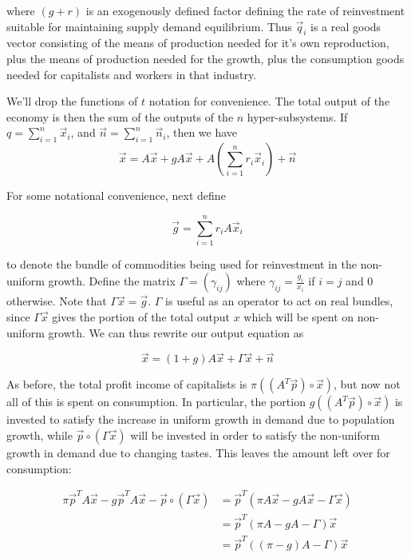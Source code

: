 \documentclass{article}
\theoremstyle{definition}
\begin{document}
where $(g+r)$ is an exogenously defined factor defining the rate of reinvestment suitable for maintaining supply demand equilibrium. Thus $\vec{q}_i$ is a real goods vector consisting of the means of production needed for it's own reproduction, plus the means of production needed for the growth, plus the consumption goods needed for capitalists and workers in that industry. 

We'll drop the functions of $t$ notation for convenience. The total output of the economy is then the sum of the outputs of the $n$ hyper-subsystems. If $q = \sum_{i=1}^n \vec{x}_i$, and $\vec{n} = \sum_{i=1}^n \vec{n}_i$, then we have
\begin{equation}
    \vec{x} = A\vec{x}+gA\vec{x}+A\left( \sum_{i=1}^n r_i\vec{x}_i \right)+\vec{n}
\end{equation}

For some notational convenience, next define 

\[ \vec{g} = \sum_{i=1}^n r_iA\vec{x}_i \]

to denote the bundle of commodities being used for reinvestment in the non-uniform growth. Define the matrix $\Gamma = (\gamma_{ij})$ where $\gamma_{ij} = \frac{g_i}{x_i}$ if $i = j$ and $0$ otherwise. Note that $\Gamma\vec{x} = \vec{g}$. $\Gamma$ is useful as an operator to act on real bundles, since $\Gamma \vec{x}$ gives the portion of the total output $x$ which will be spent on non-uniform growth. We can thus rewrite our output equation as 

\begin{equation}
    \vec{x} = (1+g)A\vec{x}+\Gamma\vec{x}+\vec{n}
\end{equation}

As before, the total profit income of capitalists is $\pi((A^T\vec{p})\circ \vec{x})$, but now not all of this is spent on consumption. In particular, the portion $g((A^T\vec{p})\circ \vec{x})$ is invested to satisfy the increase in uniform growth in demand due to population growth, while $\vec{p} \circ (\Gamma \vec{x})$ will be invested in order to satisfy the non-uniform growth in demand due to changing tastes. This leaves the amount left over for consumption:

\begin{align}
    \pi \vec{p}^TA\vec{x} - g\vec{p}^TA\vec{x}-\vec{p}\circ (\Gamma \vec{x})&= \vec{p}^T(\pi A\vec{x}-gA\vec{x}-\Gamma \vec{x}) \\
                                               &= \vec{p}^T(\pi A - gA - \Gamma) \vec{x} \\
                                               &= \vec{p}^T((\pi-g)A-\Gamma)\vec{x}
\end{align}
\end{document}
